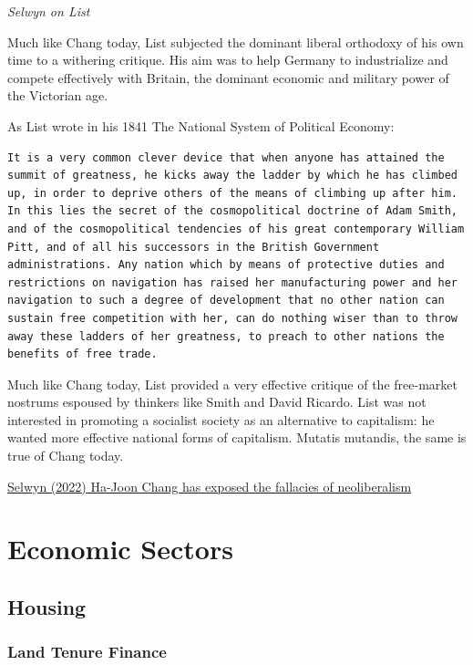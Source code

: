 \documentclass[
]{book}
\begin{document}
\emph{Selwyn on List}

Much like Chang today, List subjected the dominant liberal orthodoxy of his own time to a withering critique. His aim was to help Germany to industrialize and compete effectively with Britain, the dominant economic and military power of the Victorian age.

As List wrote in his 1841 The National System of Political Economy:

\begin{verbatim}
It is a very common clever device that when anyone has attained the summit of greatness, he kicks away the ladder by which he has climbed up, in order to deprive others of the means of climbing up after him. In this lies the secret of the cosmopolitical doctrine of Adam Smith, and of the cosmopolitical tendencies of his great contemporary William Pitt, and of all his successors in the British Government administrations. Any nation which by means of protective duties and restrictions on navigation has raised her manufacturing power and her navigation to such a degree of development that no other nation can sustain free competition with her, can do nothing wiser than to throw away these ladders of her greatness, to preach to other nations the benefits of free trade.
\end{verbatim}

Much like Chang today, List provided a very effective critique of the free-market nostrums espoused by thinkers like Smith and David Ricardo. List was not interested in promoting a socialist society as an alternative to capitalism: he wanted more effective national forms of capitalism. Mutatis mutandis, the same is true of Chang today.

\href{https://developingeconomics.org/2022/11/27/ha-joon-chang-has-exposed-the-fallacies-of-neoliberalism/}{Selwyn (2022) Ha-Joon Chang has exposed the fallacies of neoliberalism}

\hypertarget{economic-sectors}{%
\chapter{Economic Sectors}\label{economic-sectors}}

\hypertarget{housing-1}{%
\section{Housing}\label{housing-1}}

\hypertarget{land-tenure-finance}{%
\subsection{Land Tenure Finance}\label{land-tenure-finance}}
\end{document}
